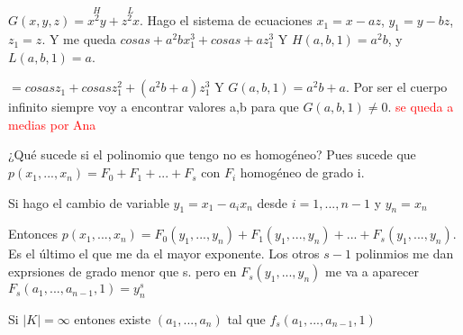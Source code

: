 \begin{example}
 $G(x,y,z)=\stackrel{H}{x^2y}+\stackrel{L}{z^2x}$. Hago el sistema de ecuaciones $x_1=x-az$, $y_1=y-bz$, $z_1=z$. Y me queda $cosas + a^2b x_1^3+cosas+ az_1^3$ Y $H(a,b,1)=a^2b$, y $L(a,b,1)=a$.

 $= cosas z_1+ cosas z_1^2+(a^2b+a)z_1^3$ Y $G(a,b,1)=a^2b+a$. Por ser el cuerpo infinito siempre voy a encontrar valores a,b para que $G(a,b,1) \neq 0$. \textcolor{red}{se queda a medias por Ana}
\end{example}


¿Qué sucede si el polinomio que tengo no es homogéneo? Pues sucede que $p(x_1,...,x_n)=F_0+F_1+...+F_s$ con $F_i$ homogéneo de grado i.

Si hago el cambio de variable $y_1=x_1-a_ix_n$ desde $i=1,...,n-1$ y $y_n=x_n$

Entonces $p(x_1,...,x_n)=F_0(y_1,...,y_n)+F_1(y_1,...,y_n)+...+F_s(y_1,...,y_n)$. Es el último el que me da el mayor exponente. Los otros $s-1$ polinmios me dan exprsiones de grado menor que s. pero en $F_s(y_1,...,y_n)$ me va a aparecer $F_s(a_{1},...,a_{n-1}, 1) = y_n^s$

Si $|K|= \infty$ entones existe $(a_1,...,a_n)$ tal que  $f_s(a_1,...,a_{n-1}, 1)$


